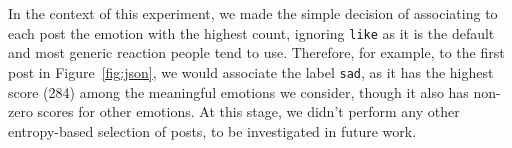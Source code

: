 \documentclass[11pt]{article}
\begin{document}
In the context of this experiment, we made the simple decision of associating to each post the emotion with the highest count, ignoring \texttt{like} as it is the default and most generic reaction people tend to use. Therefore, for example, to the first post in Figure~\ref{fig:json}, 
  we would associate the label \texttt{sad}, as it has the highest score (284) among the meaningful emotions we consider, though it also has non-zero scores for other emotions. At this stage, we didn't perform any other entropy-based selection of posts, to be investigated in future work.






%        
\end{document}
